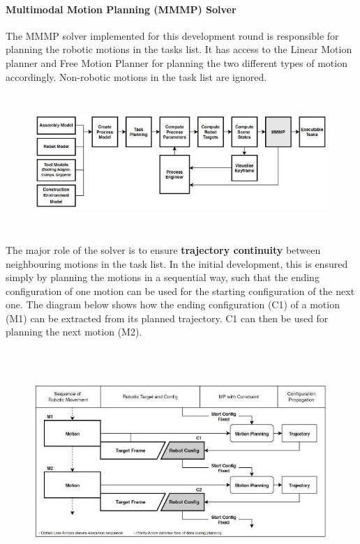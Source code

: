 \documentclass[11pt]{book}
\begin{document}
\paragraph{Multimodal Motion Planning (MMMP) Solver}

The MMMP solver implemented for this development round is responsible for planning the robotic motions in the tasks list. It has access to the Linear Motion planner and Free Motion Planner for planning the two different types of motion accordingly. Non-robotic motions in the task list are ignored.

\begin{figure}[H]
\includegraphics[width=15.92cm,height=5.19cm]{./images/image56.jpeg}
\end{figure}


The major role of the solver is to ensure \textbf{trajectory continuity} between neighbouring motions in the task list. In the initial development, this is ensured simply by planning the motions in a sequential way, such that the ending configuration of one motion can be used for the starting configuration of the next one. The diagram below shows how the ending configuration (C1) of a motion (M1) can be extracted from its planned trajectory. C1 can then be used for planning the next motion (M2).

\begin{figure}[H]
\includegraphics[width=15.92cm,height=8.47cm]{./images/image57.jpeg}
\end{figure}
\end{document}
